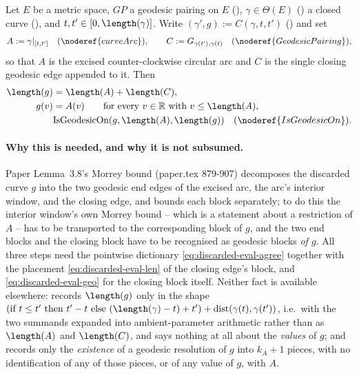 \begin{lemma}
  Let $E$ be a metric space, $GP$ a geodesic pairing on $E$ (), $\gamma \in
  \Theta(E)$ () a closed curve (), and $t,t' \in
  [0,\length(\gamma)]$. Write $(\gamma',g) := C(\gamma,t,t')$ () and set
  \[
    A := \gamma|_{[t,t']} \quad (\noderef{curveArc}) , \qquad
    C := G_{\gamma(t'),\gamma(t)} \quad (\noderef{GeodesicPairing}) ,
  \]
  so that $A$ is the excised counter-clockwise circular arc and $C$ is the single closing geodesic
  edge appended to it. Then
  \begin{align}
    \label{eq:discarded-eval-len}
    \length(g) &= \length(A) + \length(C) , \\
    \label{eq:discarded-eval-agree}
    g(v) &= A(v) \qquad \text{for every } v \in \mathbb{R} \text{ with } v \le \length(A) , \\
    \label{eq:discarded-eval-geo}
    &\mathrm{IsGeodesicOn}(g,\length(A),\length(g)) \quad (\noderef{IsGeodesicOn}) .
  \end{align}

  \paragraph{Why this is needed, and why it is not subsumed.} Paper Lemma~3.8's Morrey bound
  (paper.tex 879-907) decomposes the discarded curve $g$ into the two geodesic end edges of the
  excised arc, the arc's interior window, and the closing edge, and bounds each block separately;
  to do this the interior window's own Morrey bound -- which is a statement about a restriction of
  $A$ -- has to be transported to the corresponding block of $g$, and the two end blocks and the
  closing block have to be recognised as geodesic blocks \emph{of $g$}. All three steps need the
  pointwise dictionary \eqref{eq:discarded-eval-agree} together with the placement
  \eqref{eq:discarded-eval-len} of the closing edge's block, and \eqref{eq:discarded-eval-geo} for
  the closing block itself. Neither fact is available elsewhere:  records
  $\length(g)$ only in the shape $(\text{if } t\le t' \text{ then } t'-t \text{ else }
  (\length(\gamma)-t)+t') + \mathrm{dist}(\gamma(t),\gamma(t'))$, i.e.\ with the two summands
  expanded into ambient-parameter arithmetic rather than as $\length(A)$ and $\length(C)$, and says
  nothing at all about the \emph{values} of $g$; and 
  records only the \emph{existence} of a geodesic resolution of $g$ into $k_A+1$ pieces, with no
  identification of any of those pieces, or of any value of $g$, with $A$.
\end{lemma}
